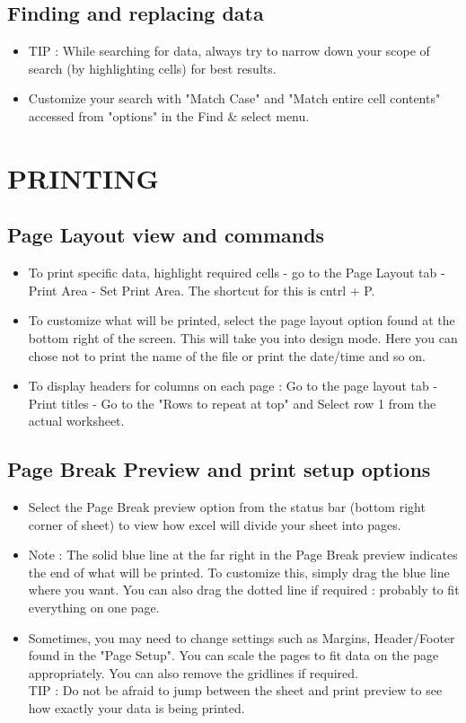 \documentclass[11pt, oneside]{article}   	%
\begin{document}
\subsection{Finding and replacing data}
\begin{itemize}
\item TIP : While searching for data, always try to narrow down your scope of search (by highlighting cells) for best results.
\item Customize your search with "Match Case" and "Match entire cell contents" accessed from "options" in the Find \& select menu.
\end{itemize}
\section{PRINTING}
\subsection{Page Layout view and commands}
\begin{itemize}
\item To print specific data, highlight required cells -\> go to the Page Layout tab -\> Print Area -\> Set Print Area. The shortcut for this is cntrl + P.
\item To customize what will be printed, select the page layout option found at the bottom right of the screen. This will take you into design mode. Here you can chose not to print the name of the file or print the date/time and so on.
\item To display headers for columns on each page : Go to the page layout tab -\> Print titles -\> Go to the "Rows to repeat at top" and Select row 1 from the actual worksheet.
\end{itemize}
\subsection{Page Break Preview and print setup options}
\begin{itemize}
\item Select the Page Break preview option from the status bar (bottom right corner of sheet) to view how excel will divide your sheet into pages.
\item Note : The solid blue line at the far right in the Page Break preview indicates the end of what will be printed. To customize this, simply drag the blue line where you want. You can also drag the dotted line if required : probably to fit everything on one page.
\item Sometimes, you may need to change settings such as Margins, Header/Footer found in the "Page Setup". You can scale the pages to fit data on the page appropriately. You can also remove the gridlines if required.
\bigskip \\
TIP : Do not be afraid to jump between the sheet and print preview to see how exactly your data is being printed.
\end{itemize}
\end{document}
